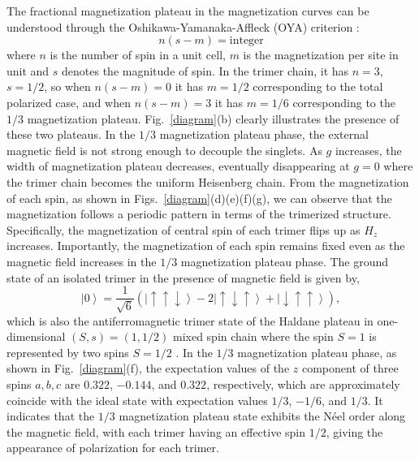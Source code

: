 \documentclass[aps,prx,showpacs,floatfix,twocolumn,superscriptaddress,nofootinbib,longbibliography]{revtex4-2}
\begin{document}
 The fractional magnetization plateau in the magnetization curves can be understood through  the Oshikawa-Yamanaka-Affleck (OYA) criterion \cite{PhysRevLett.78.1984}:
\begin{equation}
	n\left(s-m\right)=\mathrm{integer}  \label{OYA}
\end{equation}
where $n$ is the number of spin in a unit cell, $m$ is the magnetization per site in unit and $s$ denotes the magnitude of spin. In the trimer chain, it has $n=3$, $s=1/2$, so when $n(s-m)=0$  it has $m=1/2$ corresponding to the total polarized case, and when $n(s-m)=3$ it has $m=1/6$ corresponding to the $1/3$ magnetization plateau. Fig.~\ref{diagram}(b) clearly illustrates the presence of these two plateaus. In the $1/3$ magnetization plateau phase,   the external magnetic field is not strong enough to decouple the singlets.
As $g$ increases, the width of magnetization plateau  decreases, eventually disappearing  at $g=0$ where the trimer chain becomes the uniform Heisenberg chain.
From the magnetization of each spin, as shown in Figs.~\ref{diagram}(d)(e)(f)(g), we can observe that the magnetization  follows a periodic pattern in terms of the trimerized structure. Specifically, the magnetization of central spin of each trimer  flips up as $H_z$ increases. Importantly, 
 the magnetization of  each spin remains fixed even as  the magnetic field increases  in the $1/3$ magnetization plateau phase. The ground state of an isolated trimer in the presence of magnetic field is given by, 
\begin{equation}
\left|0\right\rangle  = \frac{1}{{\sqrt 6 }}\left( {\left| { \uparrow  \uparrow  \downarrow } \right\rangle  - 2\left| { \uparrow  \downarrow  \uparrow } \right\rangle  + \left| { \downarrow  \uparrow  \uparrow } \right\rangle } \right),
\end{equation}
which is also the  antiferromagnetic trimer state of the Haldane plateau in one-dimensional $ (S,s)=(1,1/2)$ mixed spin chain where the spin $S=1$ is represented by two spins $S=1/2$ \cite{PhysRevB.65.214403}.  In the $1/3$ magnetization plateau phase, as shown in Fig.~\ref{diagram}(f), the expectation values of the $z$ component of three spins $a,b,c$ are  $0.322$, $-0.144$, and $0.322$, respectively, which are approximately coincide  with the ideal state with expectation values $1/3$, $-1/6$, and $1/3$.  It indicates that the $1/3$ magnetization plateau state exhibits the N\'{e}el order along the magnetic field, with each trimer having an effective spin $1/2$, giving the appearance of polarization for each trimer. 
 
\end{document}
